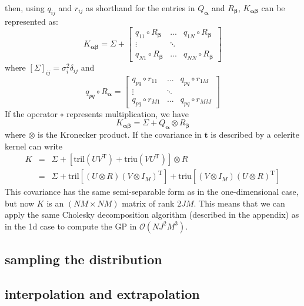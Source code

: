 \documentclass[modern]{aastex62}
\newcommand{\project}[1]{\textsf{#1}}
\newcommand{\celerite}{\project{celerite }}
\newcommand{\bvec}[1]{{\ensuremath{\boldsymbol{#1}}}}
\newcommand{\T}{\ensuremath{\mathrm{T}}}
\begin{document}
	then, using $q_{ij}$ and $r_{ij}$ as shorthand for the entries in $Q_\bvec{\alpha}$ and $R_\bvec{\beta}$, $K_\bvec{\alpha\beta}$ can be represented as: 
	\begin{equation}
		K_\bvec{\alpha\beta} = \Sigma + 
			\begin{bmatrix}
				q_{11}\circ R_\bvec{\beta} & ... & q_{1N}\circ R_\bvec{\beta} \\
				\vdots & \ddots & \\
				q_{N1}\circ R_\bvec{\beta} & ... & q_{NN}\circ R_\bvec{\beta}
			\end{bmatrix}
	\end{equation}
	where $[\Sigma]_{ij} = \sigma_i^2\delta_{ij}$ and
	\begin{equation}
		q_{pq}\circ R_\bvec{\alpha} = 
			\begin{bmatrix}
				q_{pq}\circ r_{11} & ... & q_{pq}\circ r_{1M} \\
				\vdots & \ddots & \\
				q_{pq}\circ r_{M1} & ... & q_{pq}\circ r_{MM}
			\end{bmatrix}
	\end{equation}
	If the operator $\circ$ represents multiplication, we have 
	\begin{equation}
		K_\bvec{\alpha\beta} = \Sigma + Q_\bvec{\alpha} \otimes  R_\bvec{\beta}
	\end{equation}
	where $\otimes$ is the Kronecker product. If the covariance in $\bvec{t}$ is described by a \celerite kernel can write 
	\begin{eqnarray}
		K &=& \Sigma + \left[\mathrm{tril}(UV^\T) + \mathrm{triu}(VU^\T)\right]\otimes R \\
		&=& \Sigma + \mathrm{tril}\left[ (U\otimes R)(V\otimes I_M)^\T\right] + \mathrm{triu}\left[ (V\otimes I_M)(U\otimes R)^\T\right]
	\end{eqnarray}
	This covariance has the same semi-separable form as in the one-dimensional case, but now $K$ is an $(NM\times NM)$ matrix of rank $2JM$. 
	This means that we can apply the same Cholesky decomposition algorithm (described in the appendix) as in the 1d case to compute the GP in 
	$\mathcal{O}(NJ^2M^3)$. 
	
	\subsection{sampling the distribution}
	
	\subsection{interpolation and extrapolation}
\end{document}
